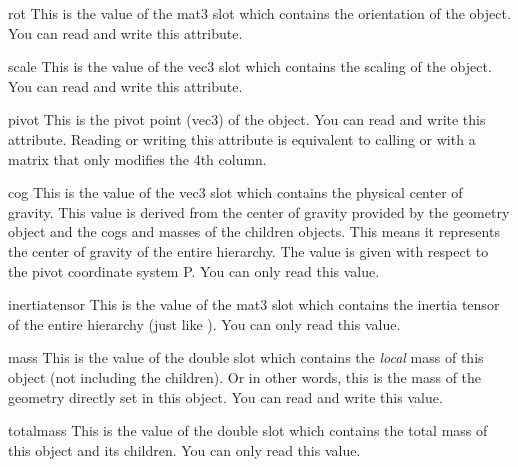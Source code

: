 \begin{memberdesc}{rot}
This is the value of the mat3 slot  which contains the 
orientation of the object. You can read and write this attribute.
\end{memberdesc}

\begin{memberdesc}{scale}
This is the value of the vec3 slot  which contains the 
scaling of the object. You can read and write this attribute.
\end{memberdesc}

\begin{memberdesc}{pivot}
This is the pivot point (vec3) of the object. You can read and write this
attribute. Reading or writing this attribute is equivalent to calling
 or  with
a matrix that only modifies the 4th column.
\end{memberdesc}

\begin{memberdesc}{cog}
This is the value of the vec3 slot  which contains the
physical center of gravity. This value is derived from the center of 
gravity provided by the geometry object and the cogs and masses of the
children objects. This means it represents the center of gravity of the 
entire hierarchy. The value is given with respect to the pivot coordinate
system P. You can only read this value.
\end{memberdesc}

\begin{memberdesc}{inertiatensor}
This is the value of the mat3 slot  which contains
the inertia tensor of the entire hierarchy (just like ). You can
only read this value.
\end{memberdesc}

\begin{memberdesc}{mass}
This is the value of the double slot  which contains the
{\em local} mass of this object (not including the children). Or in other
words, this is the mass of the geometry directly set in this object.
You can read and write this value.
\end{memberdesc}

\begin{memberdesc}{totalmass}
This is the value of the double slot  which contains
the total mass of this object and its children. You can only read this value.
\end{memberdesc}


